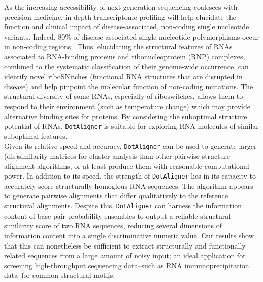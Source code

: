 \documentclass{bmcart}
\newcommand\dotaligner{\texttt{DotAligner}}
\begin{document}
As the increasing accessibility of next generation sequencing coalesces with
precision medicine, in-depth transcriptome profiling will help elucidate the
function and clinical impact of disease-associated, non-coding single
nucleotide variants. Indeed, 80\% of disease-associated single nucleotide
polymorphisms occur in non-coding regions
\cite{hindorff2009potential,ritchie2014functional}. Thus, elucidating the
structural features of RNAs associated to RNA-binding proteins and
ribonucleoprotein (RNP) complexes, combined to the systematic classification of
their genome-wide occurrence, can identify novel riboSNitches (functional RNA
structures that are disrupted in disease) and help pinpoint the molecular
function of non-coding mutations. The structural diversity of some RNAs,
especially of riboswitches, allows them to respond to their environment (such
as temperature change) which may provide alternative binding sites for
proteins. By considering the suboptimal structure potential of RNAs, \dotaligner{}
is suitable for exploring RNA molecules of similar suboptimal features. \\

Given its relative speed and accuracy, \dotaligner{} can be used to generate
larger (dis)similarity matrices for cluster analysis than other pairwise
structure alignment algorithms, or at least produce them with reasonable
computational power. In addition to its speed, the strength of \dotaligner{} lies in
its capacity to accurately score structurally homoglous RNA sequences. The
algorithm appears to generate pairwise alignments that differ qualitatively to the
reference structural alignments. Despite this, \dotaligner{} can harness the
information content of base pair probability ensembles to output a reliable
structural similarity score of two RNA sequences, reducing several dimensions 
of information content into a single discriminative numeric value.
 Our results show that this
can nonetheless be sufficient to extract structurally and functionally related
sequences from a large amount of noisy input; an ideal application for
screening high-throughput sequencing data--such as RNA immunoprecipitation
data--for common structural motifs. \\
\end{document}
